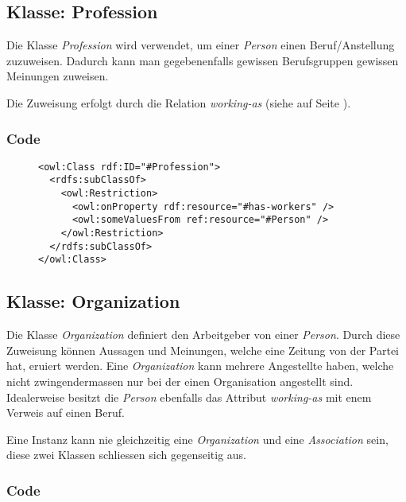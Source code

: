 \documentclass[
    11pt,
    latin1,
    a4paper,
    oneside
]{scrreprt}
\begin{document}
\subsection{Klasse: Profession} \label{sec:class_profession}

Die Klasse \emph{Profession} wird verwendet, um einer \emph{Person} einen Beruf/Anstellung zuzuweisen. Dadurch kann man gegebenenfalls gewissen Berufsgruppen gewissen Meinungen zuweisen.

Die Zuweisung erfolgt durch die Relation \emph{working-as} (siehe  auf Seite \pageref{sec:rel_workingas}).

\subsubsection{Code} \label{sec:class_profession_code}

\begin{figure}[h]
 \lstset{language=XML}
 \begin{lstlisting}[label=owl:profession,caption={Die Klasse \emph{Caption} beschreibt jegliche Berufe}]
<owl:Class rdf:ID="#Profession">
  <rdfs:subClassOf>
    <owl:Restriction>
      <owl:onProperty rdf:resource="#has-workers" />
      <owl:someValuesFrom ref:resource="#Person" />
    </owl:Restriction>
  </rdfs:subClassOf>
</owl:Class>
 \end{lstlisting}
\end{figure}


\subsection{Klasse: Organization} \label{sec:class_organization}

Die Klasse \emph{Organization} definiert den Arbeitgeber von einer \emph{Person}. Durch diese Zuweisung k\"onnen Aussagen und Meinungen, welche eine Zeitung von der Partei hat, eruiert werden. Eine \emph{Organization} kann mehrere Angestellte haben, welche nicht zwingendermassen nur bei der einen Organisation angestellt sind. Idealerweise besitzt die \emph{Person} ebenfalls das Attribut \emph{working-as} mit enem Verweis auf einen Beruf.

Eine Instanz kann nie gleichzeitig eine \emph{Organization} und eine \emph{Association} sein, diese zwei Klassen schliessen sich gegenseitig aus.

\subsubsection{Code} \label{sec:class_organization_code}
\end{document}

